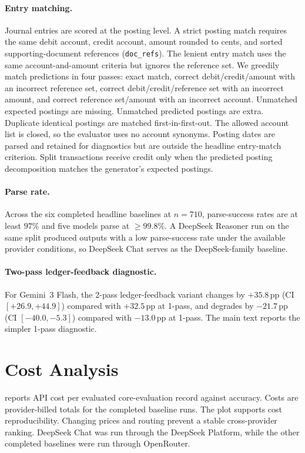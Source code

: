 \paragraph{Entry matching.}
Journal entries are scored at the posting level. A strict posting match requires the same debit account, credit account, amount rounded to cents, and sorted supporting-document references (\texttt{doc\_refs}). The lenient entry match uses the same account-and-amount criteria but ignores the reference set. We greedily match predictions in four passes: exact match, correct debit/credit/amount with an incorrect reference set, correct debit/credit/reference set with an incorrect amount, and correct reference set/amount with an incorrect account. Unmatched expected postings are missing. Unmatched predicted postings are extra. Duplicate identical postings are matched first-in-first-out. The allowed account list is closed, so the evaluator uses no account synonyms. Posting dates are parsed and retained for diagnostics but are outside the headline entry-match criterion. Split transactions receive credit only when the predicted posting decomposition matches the generator's expected postings.

\paragraph{Parse rate.}
Across the six completed headline baselines at $n{=}710$, parse-success rates are at least $97\%$ and five models parse at $\geq 99.8\%$. A DeepSeek Reasoner run on the same split produced outputs with a low parse-success rate under the available provider conditions, so DeepSeek Chat serves as the DeepSeek-family baseline.

\paragraph{Two-pass ledger-feedback diagnostic.}
For Gemini~3 Flash, the 2-pass ledger-feedback variant changes \bsexact{} by $+35.8$\,pp (CI $[+26.9, +44.9]$) compared with $+32.5$\,pp at 1-pass, and degrades \incCode{} by $-21.7$\,pp (CI $[-40.0, -5.3]$) compared with $-13.0$\,pp at 1-pass. The main text reports the simpler 1-pass diagnostic.

\section{Cost Analysis}
\label{appx:cost-analysis}

 reports API cost per evaluated core-evaluation record against \bsexact{} accuracy. Costs are provider-billed totals for the completed baseline runs. The plot supports cost reproducibility. Changing prices and routing prevent a stable cross-provider ranking. DeepSeek Chat was run through the DeepSeek Platform, while the other completed baselines were run through OpenRouter.

